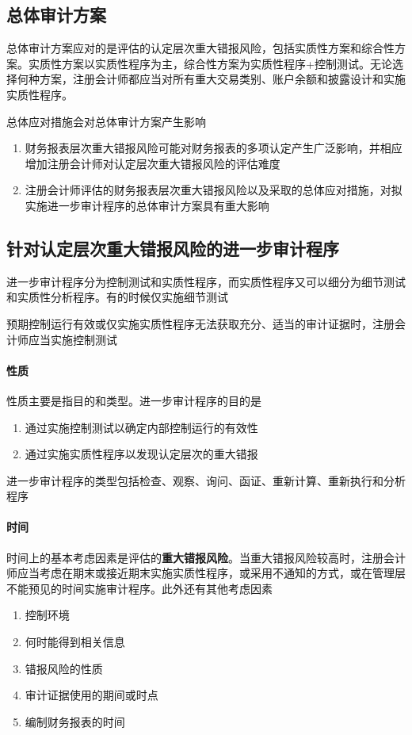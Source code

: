 \documentclass[UTF8,12pt]{ctexart}
\numberwithin{equation}{section} %
\numberwithin{figure}{section}
\numberwithin{table}{section}
\begin{document}
	\subsection{总体审计方案}
	总体审计方案应对的是评估的认定层次重大错报风险，包括实质性方案和综合性方案。实质性方案以实质性程序为主，综合性方案为实质性程序+控制测试。无论选择何种方案，注册会计师都应当对所有重大交易类别、账户余额和披露设计和实施实质性程序。
	
	总体应对措施会对总体审计方案产生影响
	\begin{enumerate}
		\item 财务报表层次重大错报风险可能对财务报表的多项认定产生广泛影响，并相应增加注册会计师对认定层次重大错报风险的评估难度
		
		\item 注册会计师评估的财务报表层次重大错报风险以及采取的总体应对措施，对拟实施进一步审计程序的总体审计方案具有重大影响
	\end{enumerate}
	
	\subsection{针对认定层次重大错报风险的进一步审计程序}
	进一步审计程序分为控制测试和实质性程序，而实质性程序又可以细分为细节测试和实质性分析程序。有的时候仅实施细节测试
	
	预期控制运行有效或仅实施实质性程序无法获取充分、适当的审计证据时，注册会计师应当实施控制测试
	
	\paragraph{性质}
	性质主要是指目的和类型。进一步审计程序的目的是
	\begin{enumerate}
		\item 通过实施控制测试以确定内部控制运行的有效性
		
		\item 通过实施实质性程序以发现认定层次的重大错报
	\end{enumerate}
	
	进一步审计程序的类型包括检查、观察、询问、函证、重新计算、重新执行和分析程序
	
	\paragraph{时间}
	时间上的基本考虑因素是评估的\textbf{重大错报风险}。当重大错报风险较高时，注册会计师应当考虑在期末或接近期末实施实质性程序，或采用不通知的方式，或在管理层不能预见的时间实施审计程序。此外还有其他考虑因素
	\begin{enumerate}
		\item 控制环境
		
		\item 何时能得到相关信息
		
		\item 错报风险的性质
		
		\item 审计证据使用的期间或时点
		
		\item 编制财务报表的时间
	\end{enumerate}
	
\end{document}
